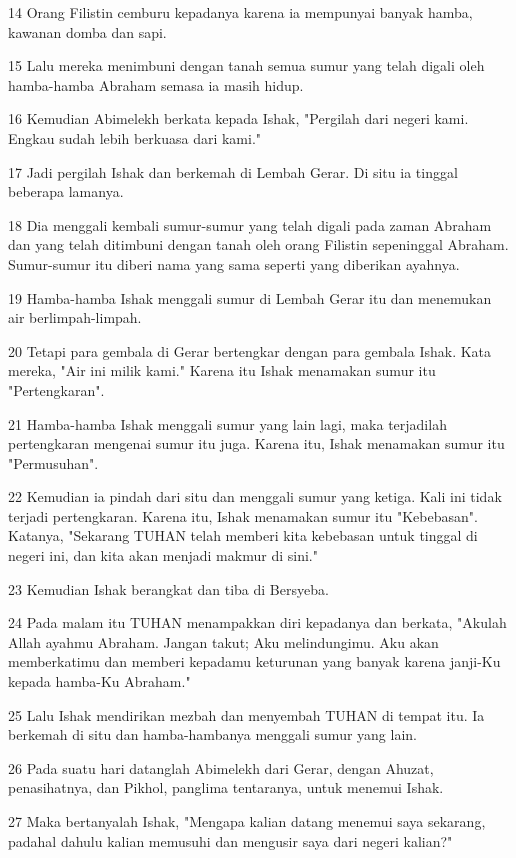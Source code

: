 \par 14 Orang Filistin cemburu kepadanya karena ia mempunyai banyak hamba, kawanan domba dan sapi.
\par 15 Lalu mereka menimbuni dengan tanah semua sumur yang telah digali oleh hamba-hamba Abraham semasa ia masih hidup.
\par 16 Kemudian Abimelekh berkata kepada Ishak, "Pergilah dari negeri kami. Engkau sudah lebih berkuasa dari kami."
\par 17 Jadi pergilah Ishak dan berkemah di Lembah Gerar. Di situ ia tinggal beberapa lamanya.
\par 18 Dia menggali kembali sumur-sumur yang telah digali pada zaman Abraham dan yang telah ditimbuni dengan tanah oleh orang Filistin sepeninggal Abraham. Sumur-sumur itu diberi nama yang sama seperti yang diberikan ayahnya.
\par 19 Hamba-hamba Ishak menggali sumur di Lembah Gerar itu dan menemukan air berlimpah-limpah.
\par 20 Tetapi para gembala di Gerar bertengkar dengan para gembala Ishak. Kata mereka, "Air ini milik kami." Karena itu Ishak menamakan sumur itu "Pertengkaran".
\par 21 Hamba-hamba Ishak menggali sumur yang lain lagi, maka terjadilah pertengkaran mengenai sumur itu juga. Karena itu, Ishak menamakan sumur itu "Permusuhan".
\par 22 Kemudian ia pindah dari situ dan menggali sumur yang ketiga. Kali ini tidak terjadi pertengkaran. Karena itu, Ishak menamakan sumur itu "Kebebasan". Katanya, "Sekarang TUHAN telah memberi kita kebebasan untuk tinggal di negeri ini, dan kita akan menjadi makmur di sini."
\par 23 Kemudian Ishak berangkat dan tiba di Bersyeba.
\par 24 Pada malam itu TUHAN menampakkan diri kepadanya dan berkata, "Akulah Allah ayahmu Abraham. Jangan takut; Aku melindungimu. Aku akan memberkatimu dan memberi kepadamu keturunan yang banyak karena janji-Ku kepada hamba-Ku Abraham."
\par 25 Lalu Ishak mendirikan mezbah dan menyembah TUHAN di tempat itu. Ia berkemah di situ dan hamba-hambanya menggali sumur yang lain.
\par 26 Pada suatu hari datanglah Abimelekh dari Gerar, dengan Ahuzat, penasihatnya, dan Pikhol, panglima tentaranya, untuk menemui Ishak.
\par 27 Maka bertanyalah Ishak, "Mengapa kalian datang menemui saya sekarang, padahal dahulu kalian memusuhi dan mengusir saya dari negeri kalian?"
